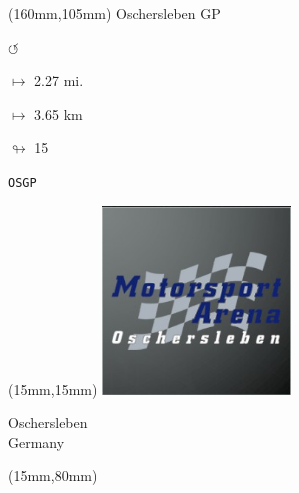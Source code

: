 \begin{textblock*}{40mm}(160mm,105mm)%
Oschersleben GP
\par \Huge$\circlearrowleft$
\Large
\par$\mapsto$ 2.27 mi.
\par$\mapsto$ 3.65 km
\par$\looparrowright$ 15
\par\hfill\tiny\tt OSGP\\
\end{textblock*}
\null\newpage

\begin{textblock*}{50mm}(15mm,15mm)%
\includegraphics[width=50mm]{LG/2015-05-20_00090.png}
\par Oschersleben\\ Germany
\end{textblock*}
\begin{textblock*}{185mm}(15mm,80mm)%
\end{textblock*}
